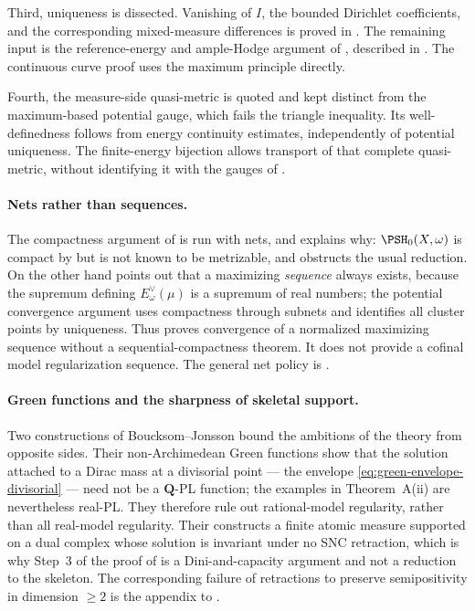 Third, uniqueness is dissected.  Vanishing of $I$, the bounded
Dirichlet coefficients, and the corresponding mixed-measure differences
is proved in .  The remaining input is the
reference-energy and ample-Hodge argument of
\cite[Proposition~8.2]{BFJ15}, described in
.  The continuous curve proof uses the
maximum principle directly.

Fourth, the measure-side quasi-metric is quoted and kept distinct from
the maximum-based potential gauge, which fails the triangle inequality.
Its well-definedness follows from energy continuity estimates,
independently of potential uniqueness.  The finite-energy bijection
allows transport of that complete quasi-metric, without identifying it
with the gauges of .

\paragraph{Nets rather than sequences.}
The compactness argument of  is run with
nets, and  explains why: $\PSH_0(X,\omega)$ is
compact by  but is not known to be metrizable,
and  obstructs the usual reduction.  On
the other hand  points out that a
maximizing \emph{sequence} always exists, because the supremum defining
$E^\vee_\omega(\mu)$ is a supremum of real numbers; the potential convergence argument uses compactness through subnets
and identifies all cluster points by uniqueness.  Thus
 proves convergence of a
normalized maximizing sequence without a sequential-compactness
theorem.  It does not provide a cofinal model regularization sequence.
The general net policy is .

\paragraph{Green functions and the sharpness of skeletal support.}
Two constructions of Boucksom--Jonsson bound the ambitions of the theory
from opposite sides.  Their non-Archimedean Green functions
\cite[Theorem~A]{BJGreen24} show that the solution attached to a Dirac mass
at a divisorial point --- the envelope
\eqref{eq:green-envelope-divisorial} --- need not be a $\mathbf Q$-PL
function; the examples in Theorem~A(ii) are nevertheless real-PL.
They therefore rule out rational-model regularity, rather than all
real-model regularity.  Their
\cite[Theorem~B]{BJGreen24} constructs a finite atomic measure supported on a
dual complex whose solution is invariant under no SNC retraction, which is
why Step~3 of the proof of  is a Dini-and-capacity
argument and not a reduction to the skeleton.  The corresponding failure of
retractions to preserve semipositivity in dimension $\geq2$ is the appendix
to \cite{GJKM19}.

